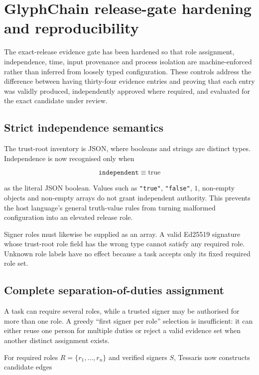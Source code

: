 \section{GlyphChain release-gate hardening and reproducibility}
\label{sec:glyphchain-release-gate-hardening}

The exact-release evidence gate has been hardened so that role assignment,
independence, time, input provenance and process isolation are machine-enforced
rather than inferred from loosely typed configuration.  These controls address
the difference between having thirty-four evidence entries and proving that each
entry was validly produced, independently approved where required, and evaluated
for the exact candidate under review.

\subsection{Strict independence semantics}

The trust-root inventory is JSON, where booleans and strings are distinct types.
Independence is now recognised only when

\begin{equation}
  \texttt{independent} \equiv \mathrm{true}
\end{equation}

as the literal JSON boolean.  Values such as \texttt{"true"},
\texttt{"false"}, $1$, non-empty objects and non-empty arrays do not grant
independent authority.  This prevents the host language's general truth-value
rules from turning malformed configuration into an elevated release role.

Signer roles must likewise be supplied as an array.  A valid Ed25519 signature
whose trust-root role field has the wrong type cannot satisfy any required role.
Unknown role labels have no effect because a task accepts only its fixed required
role set.

\subsection{Complete separation-of-duties assignment}

A task can require several roles, while a trusted signer may be authorised for
more than one role.  A greedy ``first signer per role'' selection is insufficient:
it can either reuse one person for multiple duties or reject a valid evidence set
when another distinct assignment exists.

For required roles $R=\{r_1,\ldots,r_n\}$ and verified signers $S$, Tessaris now
constructs candidate edges

